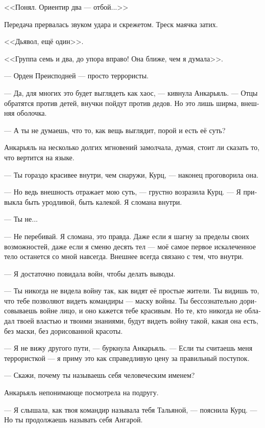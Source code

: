 \documentclass[a4paper,10pt,fleqn]{book}\usepackage{polyglossia}\setdefaultlanguage[babelshorthands=true]{russian}\setotherlanguage{english}\defaultfontfeatures{Ligatures=TeX,Mapping=tex-text}\usepackage{xcolor}\newcommand{\ml}[3]{#2}
\newcommand{\asterism}{\vspace{1em}{\centering\Large\bfseries$\ast~\ast~\ast$\par}\vspace{1em}}
\begin{document}
\ml{$0$}
{<<Понял.}
{``Roger that.}
\ml{$0$}
{Ориентир два --- отбой...>>}
{Beacon two is off---''}

Передача прервалась звуком удара и скрежетом.
Треск маячка затих.

<<Дьявол, ещё один>>.

<<Группа семь и два, до упора вправо!
Она ближе, чем я думала>>.

\asterism

--- Орден Преисподней --- просто террористы.

--- Да, для многих это будет выглядеть как хаос, --- кивнула Анкарьяль.
--- Отцы обратятся против детей, внучки пойдут против дедов.
Но это лишь ширма, внешняя оболочка.

--- А ты не думаешь, что то, как вещь выглядит, порой и есть её суть?

Анкарьяль на несколько долгих мгновений замолчала, думая, стоит ли сказать то, что вертится на языке.

--- Ты гораздо красивее внутри, чем снаружи, Курц, --- наконец проговорила она.

--- Но ведь внешность отражает мою суть, --- грустно возразила Курц.
--- Я привыкла быть уродливой, быть калекой.
Я сломана внутри.

--- Ты не...

--- Не перебивай.
Я сломана, это правда.
Даже если я шагну за пределы своих возможностей, даже если я сменю десять тел --- моё самое первое искалеченное тело останется со мной навсегда.
Внешнее всегда связано с тем, что внутри.

--- Я достаточно повидала войн, чтобы делать выводы.

--- Ты никогда не видела войну так, как видят её простые жители.
Ты видишь то, что тебе позволяют видеть командиры --- маску войны.
Ты бессознательно дорисовываешь войне лицо, и оно кажется тебе красивым.
Но те, кто никогда не обладал твоей властью и твоими знаниями, будут видеть войну такой, какая она есть, без маски, без дорисованной красоты.

--- Я не вижу другого пути, --- буркнула Анкарьяль.
--- Если ты считаешь меня террористкой --- я приму это как справедливую цену за правильный поступок.

--- Скажи, почему ты называешь себя человеческим именем?

Анкарьяль непонимающе посмотрела на подругу.

--- Я слышала, как твоя командир называла тебя Тальяной, --- пояснила Курц.
--- Но ты продолжаешь называть себя Ангарой.
\end{document}
